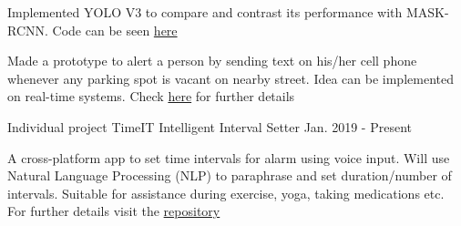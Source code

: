 \begin{cventries}
{\begin{cvitems}
        		\item {Implemented YOLO V3 to compare and contrast its performance with MASK-RCNN. Code can be seen   \href{https://github.com/ankit1khare/Smart-Park-with-YOLO-V3}{here}} 
        		\item {Made a prototype to alert a person by sending text on his/her cell phone whenever any parking spot is vacant on nearby street. Idea can be implemented on real-time systems. Check \href{https://github.com/ankit1khare/Easy_street_parking_with_MASK-RCNN}{here} for further details}
        		\vspace*{0.09in}  
      		\end{cvitems}
    	}
	\cventry
    	{Individual project} %
    	{TimeIT} 
    	{Intelligent Interval Setter}
    	{Jan. 2019 - Present} %
    	{
      		\begin{cvitems} %
        		\item {A cross-platform app to set time intervals for alarm using voice input. Will use Natural Language Processing (NLP) to paraphrase and set duration/number of intervals. Suitable for assistance during exercise, yoga, taking medications etc. For further details visit the \href{https://github.com/ankit1khare/Seq-2-Seq-on-custom-data}{repository}}
        		\vspace*{0.06in}
      		\end{cvitems}
    	} 
\end{cventries}